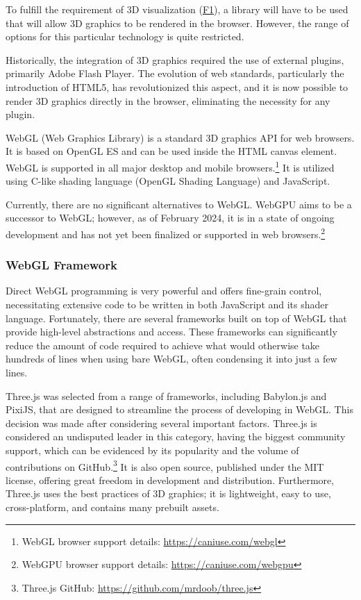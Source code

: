 To fulfill the requirement of 3D visualization (\hyperref[itm:F1]{F1}), a library will have to be used that will allow 3D graphics to be rendered in the browser. However, the range of options for this particular technology is quite restricted.

Historically, the integration of 3D graphics required the use of external plugins, primarily Adobe Flash Player. The evolution of web standards, particularly the introduction of HTML5, has revolutionized this aspect, and it is now possible to render 3D graphics directly in the browser, eliminating the necessity for any plugin. \cite{Parisi2014}

WebGL (Web Graphics Library) is a standard 3D graphics API for web browsers. It is based on OpenGL ES and can be used inside the HTML canvas element. WebGL is supported in all major desktop and mobile browsers.\footnote{WebGL browser support details: \url{https://caniuse.com/webgl}} It is utilized using C-like shading language (OpenGL Shading Language) and JavaScript. \cite{Parisi2012}

Currently, there are no significant alternatives to WebGL. WebGPU aims to be a successor to WebGL; however, as of February 2024, it is in a state of ongoing development and has not yet been finalized or supported in web browsers.\footnote{WebGPU browser support details: \url{https://caniuse.com/webgpu}} \cite{WebGPU}


\subsubsection{WebGL Framework} \label{section:WebGL}

Direct WebGL programming is very powerful and offers fine-grain control, necessitating extensive code to be written in both JavaScript and its shader language. Fortunately, there are several frameworks built on top of WebGL that provide high-level abstractions and access. These frameworks can significantly reduce the amount of code required to achieve what would otherwise take hundreds of lines when using bare WebGL, often condensing it into just a few lines. \cite{Parisi2014}

Three.js was selected from a range of frameworks, including Babylon.js and PixiJS, that are designed to streamline the process of developing in WebGL. This decision was made after considering several important factors. \cite{BabylonJs} \cite{PixiJS}
Three.js is considered an undisputed leader in this category, having the biggest community support, which can be evidenced by its popularity and the volume of contributions on GitHub.\footnote{Three.js GitHub: \url{https://github.com/mrdoob/three.js}} It is also open source, published under the MIT license, offering great freedom in development and distribution. Furthermore, Three.js uses the best practices of 3D graphics; it is lightweight, easy to use, cross-platform, and contains many prebuilt assets. \cite{ThreeJs}


